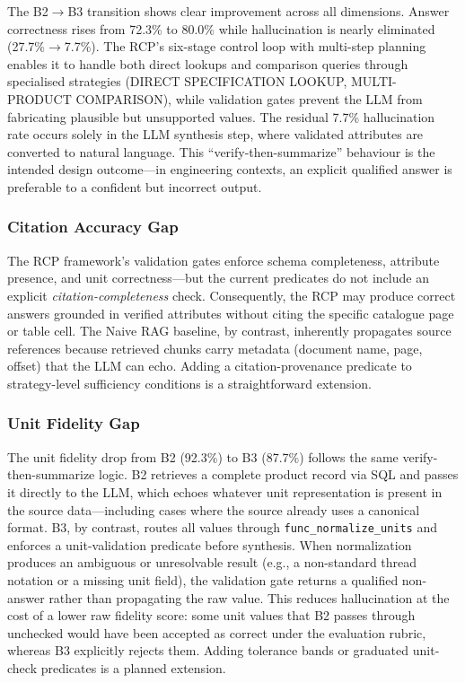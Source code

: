 \documentclass[largeformat]{interact}
\begin{document}
The B2$\rightarrow$B3 transition shows clear improvement across all dimensions. Answer correctness rises from 72.3\% to 80.0\% while hallucination is nearly eliminated (27.7\%$\rightarrow$7.7\%). The RCP's six-stage control loop with multi-step planning enables it to handle both direct lookups and comparison queries through specialised strategies (DIRECT SPECIFICATION LOOKUP, MULTI-PRODUCT COMPARISON), while validation gates prevent the LLM from fabricating plausible but unsupported values. The residual 7.7\% hallucination rate occurs solely in the LLM synthesis step, where validated attributes are converted to natural language. This ``verify-then-summarize'' behaviour is the intended design outcome---in engineering contexts, an explicit qualified answer is preferable to a confident but incorrect output.

\subsubsection{Citation Accuracy Gap}
\label{subsubsection:citation_accuracy_gap}
The RCP framework's validation gates enforce schema completeness, attribute presence, and unit correctness---but the current predicates do not include an explicit \emph{citation-completeness} check. Consequently, the RCP may produce correct answers grounded in verified attributes without citing the specific catalogue page or table cell. The Naive RAG baseline, by contrast, inherently propagates source references because retrieved chunks carry metadata (document name, page, offset) that the LLM can echo. Adding a citation-provenance predicate to strategy-level sufficiency conditions is a straightforward extension.

\subsubsection{Unit Fidelity Gap}
\label{subsubsection:unit_fidelity_gap}
The unit fidelity drop from B2 (92.3\%) to B3 (87.7\%) follows the same verify-then-summarize logic. B2 retrieves a complete product record via SQL and passes it directly to the LLM, which echoes whatever unit representation is present in the source data---including cases where the source already uses a canonical format. B3, by contrast, routes all values through \texttt{func\_normalize\_units} and enforces a unit-validation predicate before synthesis. When normalization produces an ambiguous or unresolvable result (e.g., a non-standard thread notation or a missing unit field), the validation gate returns a qualified non-answer rather than propagating the raw value. This reduces hallucination at the cost of a lower raw fidelity score: some unit values that B2 passes through unchecked would have been accepted as correct under the evaluation rubric, whereas B3 explicitly rejects them. Adding tolerance bands or graduated unit-check predicates is a planned extension.
\end{document}

